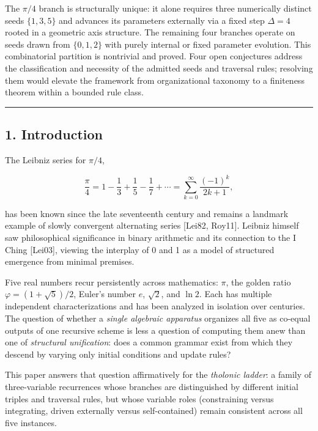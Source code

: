 \documentclass[
  11pt,
  letterpaper,
]{article}
\begin{document}
The \(\pi/4\) branch is structurally unique: it alone requires three
numerically distinct seeds \(\{1, 3, 5\}\) and advances its parameters
externally via a fixed step \(\Delta = 4\) rooted in a geometric axis
structure. The remaining four branches operate on seeds drawn from
\(\{0, 1, 2\}\) with purely internal or fixed parameter evolution. This
combinatorial partition is nontrivial and proved. Four open conjectures
address the classification and necessity of the admitted seeds and
traversal rules; resolving them would elevate the framework from
organizational taxonomy to a finiteness theorem within a bounded rule
class.

\begin{center}\rule{0.5\linewidth}{0.5pt}\end{center}

\subsection{1. Introduction}\label{introduction}

The Leibniz series for \(\pi/4\),

\[\frac{\pi}{4} = 1 - \frac{1}{3} + \frac{1}{5} - \frac{1}{7} + \cdots = \sum_{k=0}^{\infty} \frac{(-1)^k}{2k+1},\]

has been known since the late seventeenth century and remains a landmark
example of slowly convergent alternating series {[}Lei82, Roy11{]}.
Leibniz himself saw philosophical significance in binary arithmetic and
its connection to the I Ching {[}Lei03{]}, viewing the interplay of 0
and 1 as a model of structured emergence from minimal premises.

Five real numbers recur persistently across mathematics: \(\pi\), the
golden ratio \(\varphi = (1+\sqrt{5})/2\), Euler's number \(e\),
\(\sqrt{2}\), and \(\ln 2\). Each has multiple independent
characterizations and has been analyzed in isolation over centuries. The
question of whether a \emph{single algebraic apparatus} organizes all
five as co-equal outputs of one recursive scheme is less a question of
computing them anew than one of \emph{structural unification}: does a
common grammar exist from which they descend by varying only initial
conditions and update rules?

This paper answers that question affirmatively for the \emph{tholonic
ladder}: a family of three-variable recurrences whose branches are
distinguished by different initial triples and traversal rules, but
whose variable roles (constraining versus integrating, driven externally
versus self-contained) remain consistent across all five instances.
\end{document}
